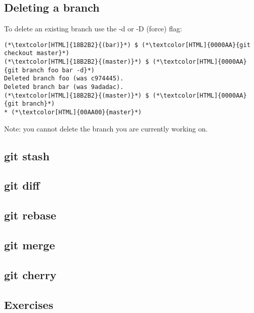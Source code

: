 \subsection{Deleting a branch}
\begin{frame}[fragile]
    \subslidetitle
To delete an existing branch use the -d or -D (force) flag:
\begin{lstlisting}
(*\textcolor[HTML]{18B2B2}{(bar)}*) $ (*\textcolor[HTML]{0000AA}{git checkout master}*)
(*\textcolor[HTML]{18B2B2}{(master)}*) $ (*\textcolor[HTML]{0000AA}{git branch foo bar -d}*)
Deleted branch foo (was c974445).
Deleted branch bar (was 9adadac).
(*\textcolor[HTML]{18B2B2}{(master)}*) $ (*\textcolor[HTML]{0000AA}{git branch}*)
* (*\textcolor[HTML]{00AA00}{master}*)
\end{lstlisting}

Note: you cannot delete the branch you are currently working on.

\end{frame}

\subsection{git stash}
\begin{frame}[fragile]
    \subslidetitle
\end{frame}

\subsection{git diff}
\begin{frame}[fragile]
    \subslidetitle
\end{frame}

\subsection{git rebase}
\begin{frame}[fragile]
    \subslidetitle
\end{frame}

\subsection{git merge}
\begin{frame}[fragile]
    \subslidetitle
\end{frame}

\subsection{git cherry}
\begin{frame}[fragile]
    \subslidetitle
\end{frame}

\subsection{Exercises}
\begin{frame}[fragile]
  \subslidetitle
\end{frame}
